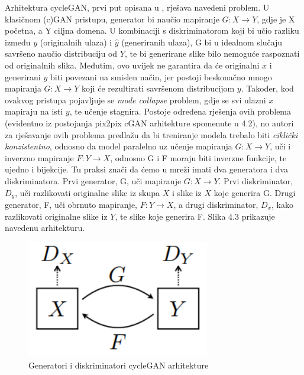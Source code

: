 Arhitektura cycleGAN, prvi put opisana u \citep{cycleGANOriginal}, rješava navedeni problem. U klasičnom (c)GAN pristupu, generator bi naučio mapiranje $G: X \longrightarrow Y$, gdje je X početna, a Y ciljna domena. U kombinaciji s diskriminatorom koji bi učio razliku između $y$ (originalnih ulaza) i $ \hat{y}$ (generiranih ulaza), G bi u idealnom slučaju savršeno naučio distribuciju od $Y$, te bi generirane slike bilo nemoguće raspoznati od originalnih slika. Međutim, ovo uvijek ne garantira da će originalni $x$ i generirani $y$ biti povezani na smislen način, jer postoji beskonačno mnogo mapiranja $G:X \longrightarrow Y$ koji će rezultirati savršenom distribucijom $y$. Također, kod ovakvog pristupa pojavljuje se \textit{mode collapse} problem, gdje se svi ulazni $x$ mapiraju na isti $y$, te učenje stagnira. Postoje određena rješenja ovih problema (evidentno iz postojanja pix2pix cGAN arhitekture spomenute u 4.2), no autori za rješavanje ovih problema predlažu da bi treniranje modela trebalo biti \textit{ciklički konzistentno}, odnosno da model paralelno uz učenje mapiranja $G:X \longrightarrow Y$, uči i inverzno mapiranje $F:Y \longrightarrow X$, odnosno G i F moraju biti inverzne funkcije, te ujedno i bijekcije. Tu praksi znači da ćemo u mreži imati dva generatora i dva diskriminatora. Prvi generator, G, uči mapiranje $G:X \longrightarrow Y$. Prvi diskriminator, $D_{y}$, uči razlikovati originalne slike iz skupa $X$ i slike iz $X$ koje generira G. Drugi generator, F, uči obrnuto mapiranje, $F:Y \longrightarrow X$, a drugi diskriminator, $D_{x}$, kako razlikovati originalne slike iz $Y$, te slike koje generira F. Slika 4.3 prikazuje navedenu arhitekturu.\\

\begin{figure}[htb]
\centering
\includegraphics[width=8cm]{slike/cycleGAN1.png}
\caption{Generatori i diskriminatori cycleGAN arhitekture \citep{cycleGANOriginal}}
\label{fig:fer-logo}
\end{figure}
\textbf{}


